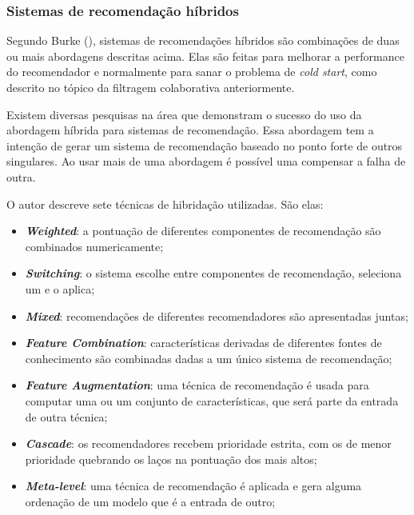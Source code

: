 \subsubsection{Sistemas de recomendação híbridos}
\label{Hybrid}
Segundo Burke (\citeyear{Burke:2007}), sistemas de recomendações híbridos são combinações de duas ou mais abordagens descritas acima. Elas são feitas para melhorar a performance do recomendador e normalmente para sanar o problema de \textit{cold start}, como descrito no tópico da filtragem colaborativa anteriormente.

Existem diversas pesquisas na área que demonstram o sucesso do uso da abordagem híbrida para sistemas de recomendação. Essa abordagem tem a intenção de gerar um sistema de recomendação baseado no ponto forte de outros singulares. Ao usar mais de uma abordagem é possível uma compensar a falha de outra.

O autor descreve sete técnicas de hibridação utilizadas. São elas:

\begin{itemize}
    \item \textbf{\textit{Weighted}}: a pontuação de diferentes componentes de recomendação são combinados numericamente;
    
    \item \textbf{\textit{Switching}}: o sistema escolhe entre componentes de recomendação, seleciona um e o aplica;
    
    \item \textbf{\textit{Mixed}}: recomendações de diferentes recomendadores são apresentadas juntas;
    
    \item \textbf{\textit{Feature Combination}}: características derivadas de diferentes fontes de conhecimento são combinadas dadas a um único sistema de recomendação;
    
    \item \textbf{\textit{Feature Augmentation}}:  uma técnica de recomendação é usada para computar uma ou um conjunto de características, que será parte da entrada de outra técnica;
    
    \item \textbf{\textit{Cascade}}: os recomendadores recebem prioridade estrita, com os de menor prioridade quebrando os laços na pontuação dos mais altos;

    \item \textbf{\textit{Meta-level}}: uma técnica de recomendação é aplicada e gera alguma ordenação de um modelo que é a entrada de outro;

\end{itemize}

